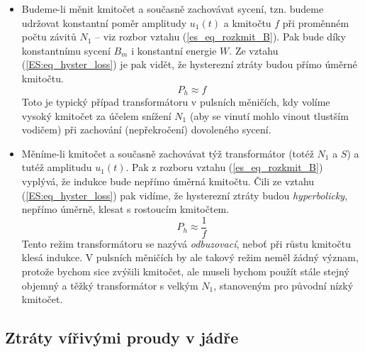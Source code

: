       \begin{itemize}
        \item Budeme-li měnit kmitočet a současně zachovávat sycení, tzn. budeme udržovat konstantní poměr 
              amplitudy  $u_1(t)$ a kmitočtu $f$ při proměnném počtu závitů  $N_1$ – viz rozbor vztahu 
              (\ref{es_eq_rozkmit_B}). Pak bude díky konstantnímu sycení $B_m$ i konstantní energie $W$. Ze 
              vztahu (\ref{ES:eq_hyster_loss}) je pak vidět, že hysterezní ztráty budou přímo úměrné kmitočtu.
              \begin{equation}\label{ES:eq_hyst_loss_linf}
                P_h \approx f
              \end{equation}
              Toto je typický případ transformátoru v pulsních měničích, kdy volíme vysoký kmitočet za účelem 
              snížení  $N_1$ (aby se vinutí mohlo vinout tlustším vodičem) při zachování (nepřekročení) 
              dovoleného sycení.
        \item Měníme-li kmitočet a současně zachovávat týž transformátor (totéž $N_1$ a $S$) a tutéž 
              amplitudu $u_1(t)$. Pak z rozboru vztahu (\ref{es_eq_rozkmit_B}) vyplývá, že indukce bude 
              nepřímo úměrná kmitočtu.  Čili ze vztahu (\ref{ES:eq_hyster_loss}) pak vidíme, že hysterezní 
              ztráty budou \emph{hyperbolicky}, nepřímo úměrně, klesat s rostoucím kmitočtem.
              \begin{equation}\label{ES:eq_hyst_loss_hypf}
                P_h \approx \frac{1}{f}
              \end{equation}
              Tento režim transformátoru se nazývá \emph{odbuzovací}, neboť při růstu kmitočtu klesá indukce. 
              V pulsních měničích by ale takový režim neměl žádný význam, protože bychom sice zvýšili 
              kmitočet, ale museli bychom použít stále stejný objemný a těžký transformátor s velkým $N_1$, 
              stanoveným pro původní nízký kmitočet.
      \end{itemize}

    \subsection{Ztráty vířivými proudy v jádře}
